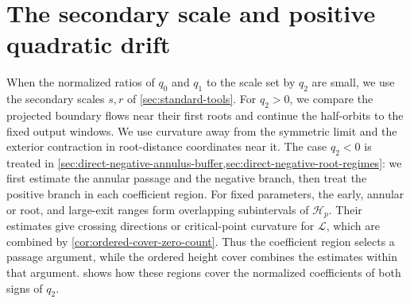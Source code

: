 \section{The secondary scale and positive quadratic drift}
\label{sec:quadratic-regimes}

When the normalized ratios of \(q_0\) and \(q_1\) to the scale set by
\(q_2\) are small, we use the secondary scales \(s,r\) of
\cref{sec:standard-tools}.
For \(q_2>0\), we compare the projected boundary flows near their first
roots and continue the half-orbits to the fixed output windows.
We use curvature away from the symmetric limit and the exterior
contraction in root-distance coordinates near it.
The case \(q_2<0\) is treated in
\cref{sec:direct-negative-annulus-buffer,sec:direct-negative-root-regimes}:
we first estimate the annular passage and the negative branch, then
treat the positive branch in each coefficient region.
For fixed parameters, the early, annular or root, and large-exit ranges
form overlapping subintervals of \(\mathcal H_p\). Their estimates give
crossing directions or critical-point curvature for \(\mathcal L\),
which are combined by \cref{cor:ordered-cover-zero-count}.
Thus the coefficient region selects a passage argument, while the
ordered height cover combines the estimates within that argument.
 shows how these regions cover the normalized
coefficients of both signs of \(q_2\).


